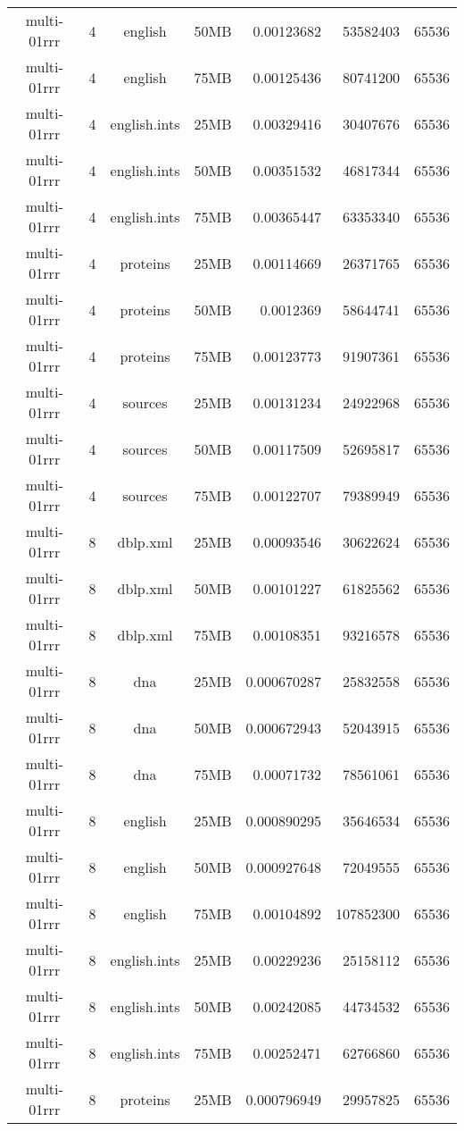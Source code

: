 \begin{table}[h]
\begin{center}
\begin{tabular}{ccccrrr}
multi-01rrr & 4 & english & 50MB & 0.00123682 & 53582403 & 65536 \\
multi-01rrr & 4 & english & 75MB & 0.00125436 & 80741200 & 65536 \\
multi-01rrr & 4 & english.ints & 25MB & 0.00329416 & 30407676 & 65536 \\
multi-01rrr & 4 & english.ints & 50MB & 0.00351532 & 46817344 & 65536 \\
multi-01rrr & 4 & english.ints & 75MB & 0.00365447 & 63353340 & 65536 \\
multi-01rrr & 4 & proteins & 25MB & 0.00114669 & 26371765 & 65536 \\
multi-01rrr & 4 & proteins & 50MB & 0.0012369 & 58644741 & 65536 \\
multi-01rrr & 4 & proteins & 75MB & 0.00123773 & 91907361 & 65536 \\
multi-01rrr & 4 & sources & 25MB & 0.00131234 & 24922968 & 65536 \\
multi-01rrr & 4 & sources & 50MB & 0.00117509 & 52695817 & 65536 \\
multi-01rrr & 4 & sources & 75MB & 0.00122707 & 79389949 & 65536 \\
multi-01rrr & 8 & dblp.xml & 25MB & 0.00093546 & 30622624 & 65536 \\
multi-01rrr & 8 & dblp.xml & 50MB & 0.00101227 & 61825562 & 65536 \\
multi-01rrr & 8 & dblp.xml & 75MB & 0.00108351 & 93216578 & 65536 \\
multi-01rrr & 8 & dna & 25MB & 0.000670287 & 25832558 & 65536 \\
multi-01rrr & 8 & dna & 50MB & 0.000672943 & 52043915 & 65536 \\
multi-01rrr & 8 & dna & 75MB & 0.00071732 & 78561061 & 65536 \\
multi-01rrr & 8 & english & 25MB & 0.000890295 & 35646534 & 65536 \\
multi-01rrr & 8 & english & 50MB & 0.000927648 & 72049555 & 65536 \\
multi-01rrr & 8 & english & 75MB & 0.00104892 & 107852300 & 65536 \\
multi-01rrr & 8 & english.ints & 25MB & 0.00229236 & 25158112 & 65536 \\
multi-01rrr & 8 & english.ints & 50MB & 0.00242085 & 44734532 & 65536 \\
multi-01rrr & 8 & english.ints & 75MB & 0.00252471 & 62766860 & 65536 \\
multi-01rrr & 8 & proteins & 25MB & 0.000796949 & 29957825 & 65536 \\

\end{tabular}
\end{center}
\end{table}
